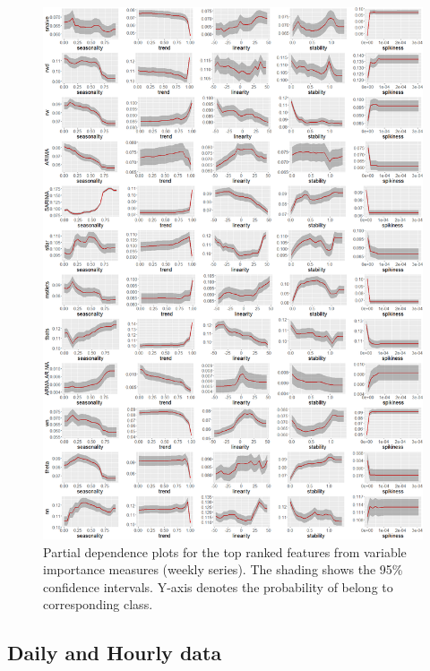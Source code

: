 \documentclass[11pt,a4paper,]{article}
\begin{document}
\begin{figure}
\centering
\includegraphics{figures/weeklypdp-1.png}
\caption{\label{fig:weeklypdp}Partial dependence plots for the top ranked
features from variable importance measures (weekly series). The shading
shows the 95\% confidence intervals. Y-axis denotes the probability of
belong to corresponding class.}
\end{figure}

\newpage

\subsection{Daily and Hourly data}\label{daily-and-hourly-data}
\end{document}
